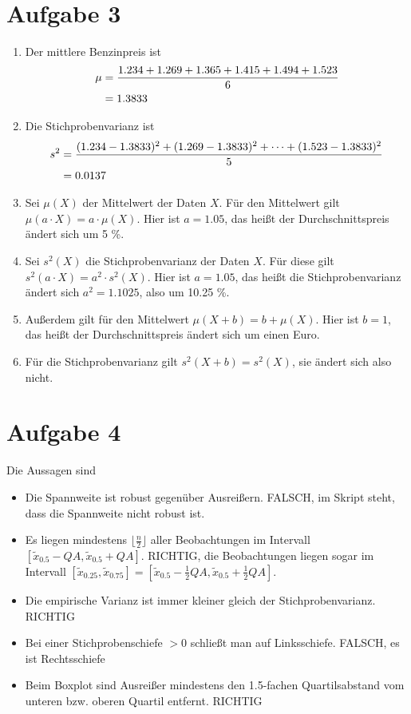 \documentclass{article}
\begin{document}
	\section*{Aufgabe 3}
	\begin{enumerate}[label=(\alph*)]
		\item Der mittlere Benzinpreis ist
		\begin{align}
			\mu &= \frac{1.234 + 1.269 + 1.365 + 1.415 + 1.494 + 1.523}{6} \notag \\
			&= 1.3833 \notag
		\end{align}
		\item Die Stichprobenvarianz ist
		\begin{align}
			s^2 &= \frac{(1.234-1.3833)^2 + (1.269-1.3833)^2 + \dots + (1.523-1.3833)^2}{5} \notag \\
			&= 0.0137 \notag
		\end{align}
		\item Sei $\mu(X)$ der Mittelwert der Daten $X$. Für den Mittelwert gilt $\mu(a\cdot X) = a\cdot\mu(X)$. Hier ist $a=1.05$, das heißt der Durchschnittspreis ändert sich um 5 \%.
		\item Sei $s^2(X)$ die Stichprobenvarianz der Daten $X$. Für diese gilt $s^2(a\cdot X) = a^2\cdot s^2(X)$. Hier ist $a=1.05$, das heißt die Stichprobenvarianz ändert sich $a^2=1.1025$, also um 10.25 \%.
		\item Außerdem gilt für den Mittelwert $\mu(X + b) = b + \mu(X)$. Hier ist $b=1$, das heißt der Durchschnittspreis ändert sich um einen Euro.
		\item Für die Stichprobenvarianz gilt $s^2(X+b) = s^2(X)$, sie ändert sich also nicht.
	\end{enumerate}

	\section*{Aufgabe 4}
	Die Aussagen sind
	\begin{itemize}
		\item Die Spannweite ist robust gegenüber Ausreißern. FALSCH, im Skript steht, dass die Spannweite nicht robust ist.
		\item Es liegen mindestens $\lfloor \frac{n}{2}\rfloor$ aller Beobachtungen im Intervall $[\tilde{x}_{0.5}-QA,\tilde{x}_{0.5}+QA]$. RICHTIG, die Beobachtungen liegen sogar im Intervall $[\tilde{x}_{0.25},\tilde{x}_{0.75}] = [\tilde{x}_{0.5}-\frac{1}{2}QA,\tilde{x}_{0.5}+\frac{1}{2}QA]$.
		\item Die empirische Varianz ist immer kleiner gleich der Stichprobenvarianz. RICHTIG
		\item Bei einer Stichprobenschiefe $>0$ schließt man auf Linksschiefe. FALSCH, es ist Rechtsschiefe
		\item Beim Boxplot sind Ausreißer mindestens den 1.5-fachen Quartilsabstand vom unteren bzw. oberen Quartil entfernt. RICHTIG
	\end{itemize}
	
\end{document}
